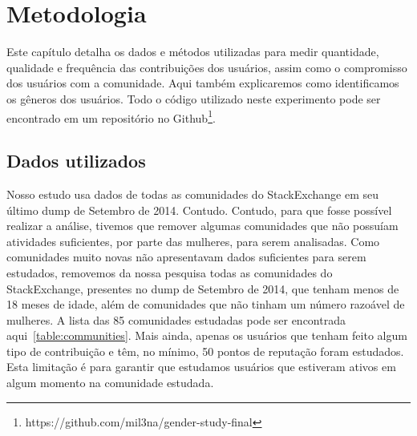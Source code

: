 \chapter{Metodologia}

Este capítulo detalha os dados e métodos utilizadas para medir quantidade, qualidade e frequência das contribuições dos usuários, assim como o compromisso dos usuários com a comunidade. Aqui também explicaremos como identificamos os gêneros dos usuários. Todo o código utilizado neste experimento pode ser encontrado em um repositório no Github\footnote{https://github.com/mil3na/gender-study-final}. 

\section{Dados utilizados}

Nosso estudo usa dados de todas as comunidades do StackExchange em seu último dump de Setembro de 2014. Contudo. Contudo, para que fosse possível realizar a análise, tivemos que remover  algumas comunidades que  não possuíam atividades suficientes, por parte das mulheres, para serem analisadas. Como comunidades muito novas não apresentavam dados suficientes para serem estudados, removemos da nossa pesquisa todas as comunidades do StackExchange, presentes no dump de Setembro de 2014, que tenham menos de 18 meses de idade, além de comunidades que não tinham um número razoável de mulheres. A lista das 85 comunidades estudadas pode ser encontrada aqui~\ref{table:communities}. Mais ainda, apenas os usuários que tenham feito algum tipo de contribuição e têm, no mínimo, 50 pontos de reputação foram estudados. Esta limitação é para garantir que estudamos usuários que estiveram ativos em algum momento na comunidade estudada.

